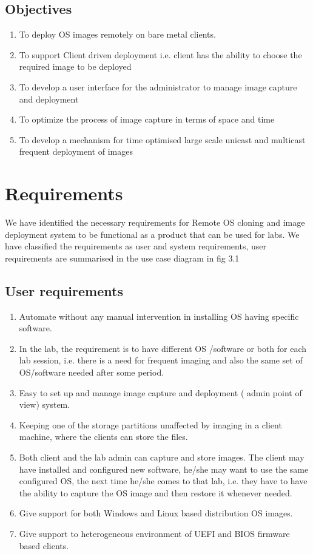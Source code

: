 \documentclass[a4paper,12pt]{article}
\begin{document}
\subsection{Objectives}
\begin{enumerate}
\item  To deploy OS images remotely on bare metal clients.
\item To support Client driven deployment i.e. client has the ability to choose the required image to be deployed
\item To develop a user interface for the administrator to manage image capture and deployment
\item To optimize the process of image capture in terms of space and time
\item To develop a mechanism for time optimised large scale unicast and multicast frequent deployment of images 
\end{enumerate}


\newpage
\section{\fontsize{16pt}{1em} Requirements}
We have identified the necessary requirements for Remote OS cloning and image deployment system to be functional as a product that can be used for labs. We have classified the requirements as user and system requirements, user requirements are summarised in the use case diagram in fig 3.1
\subsection{User requirements}
\begin{enumerate}
\item Automate without any manual intervention in installing OS having specific software.
\item In the lab, the requirement is to have different OS  /software or both for each lab session, i.e. there is a need for frequent imaging and also the same set of OS/software needed after some period.
\item Easy to set up and manage image capture and deployment ( admin point of view) system.
\item Keeping one of the storage partitions unaffected by imaging in a client machine, where the clients can store the files.
\item Both client and the lab admin can capture and store images. The client may have installed and configured new software, he/she may want to use the same configured OS, the next time he/she comes to that lab, i.e. they have to have the ability to capture the OS image and then restore it whenever needed.
\item Give support for both Windows and Linux based distribution OS images.
\item Give support to heterogeneous environment of UEFI and BIOS firmware based clients.
\end{enumerate}
\end{document}
